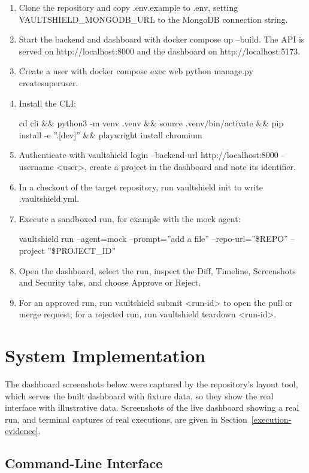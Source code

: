 \documentclass[12pt,a4paper,oneside]{report}
\providecommand{\tightlist}{\setlength{\itemsep}{0pt}\setlength{\parskip}{0pt}}
\begin{document}
\begin{enumerate}
\def\labelenumi{\arabic{enumi}.}
\tightlist
\item
  Clone the repository and copy .env.example to .env, setting VAULTSHIELD\_\allowbreak{}MONGODB\_\allowbreak{}URL to the MongoDB connection string.
\item
  Start the backend and dashboard with docker compose up --build. The API is served on http://localhost:8000 and the dashboard on http://localhost:5173.
\item
  Create a user with docker compose exec web python manage.py createsuperuser.
\item
  Install the CLI:


cd cli \&\& python3 -m venv .venv \&\& source .venv/bin/activate \&\& pip install -e ''.[dev]'' \&\& playwright install chromium
\item
  Authenticate with vaultshield login --backend-url http://localhost:8000 --username <user>, create a project in the dashboard and note its identifier.
\item
  In a checkout of the target repository, run vaultshield init to write .vaultshield.yml.
\item
  Execute a sandboxed run, for example with the mock agent:


vaultshield run --agent=mock --prompt=''add a file'' --repo-url=''\$REPO'' --project ''\$PROJECT\_ID''
\item
  Open the dashboard, select the run, inspect the Diff, Timeline, Screenshots and Security tabs, and choose Approve or Reject.
\item
  For an approved run, run vaultshield submit <run-id> to open the pull or merge request; for a rejected run, run vaultshield teardown <run-id>.
\end{enumerate}

\section{System Implementation}\label{system-implementation}

The dashboard screenshots below were captured by the repository's layout tool, which serves the built dashboard with fixture data, so they show the real interface with illustrative data. Screenshots of the live dashboard showing a real run, and terminal captures of real executions, are given in Section~\ref{execution-evidence}.

\subsection{Command-Line Interface}\label{command-line-interface-and-run-directory}
\end{document}
